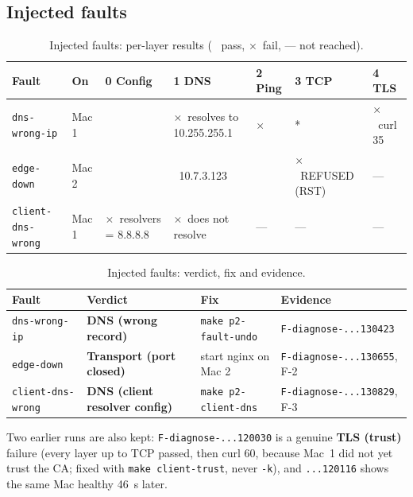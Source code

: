 \documentclass[11pt,a4paper]{article}
\newcommand{\ok}{\textcolor{lmGreen}{\checkmark}}
\newcommand{\bad}{\textcolor{lmRed}{$\times$}}
\begin{document}
\subsection{Injected faults}
\begin{table}[H]
\centering
\caption{Injected faults: per-layer results ( \ok\ pass, \bad\ fail, --- not reached).}
{\small
\begin{tabular}{@{}L{3.0cm}L{1.1cm}L{2.0cm}L{2.8cm}L{0.9cm}L{2.5cm}L{1.2cm}@{}}
\toprule
\textbf{Fault} & \textbf{On} & \textbf{0 Config} & \textbf{1 DNS} & \textbf{2 Ping} & \textbf{3 TCP} & \textbf{4 TLS} \\
\midrule
\texttt{dns-wrong-ip} & Mac 1 & \ok & \bad\ resolves to 10.255.255.1 & \bad & \ok* & \bad\ curl 35 \\
\texttt{edge-down} & Mac 2 & \ok & \ok\ 10.7.3.123 & \ok & \bad\ REFUSED (RST) & --- \\
\texttt{client-dns-wrong} & Mac 1 & \bad\ resolvers = 8.8.8.8 & \bad\ does not resolve & --- & --- & --- \\
\bottomrule
\end{tabular}}

\vspace{2pt}{\footnotesize * The campus gateway, not a real host (Incident 3).}
\end{table}

\begin{table}[H]
\centering
\caption{Injected faults: verdict, fix and evidence.}
{\small
\begin{tabular}{@{}L{3.0cm}L{3.8cm}L{3.5cm}L{3.9cm}@{}}
\toprule
\textbf{Fault} & \textbf{Verdict} & \textbf{Fix} & \textbf{Evidence} \\
\midrule
\texttt{dns-wrong-ip} & \textbf{DNS (wrong record)} & \texttt{make p2-fault-undo} & \texttt{F-diagnose-...130423} \\
\texttt{edge-down} & \textbf{Transport (port closed)} & start nginx on Mac 2 & \texttt{F-diagnose-...130655}, F-2 \\
\texttt{client-dns-wrong} & \textbf{DNS (client resolver config)} & \texttt{make p2-client-dns} & \texttt{F-diagnose-...130829}, F-3 \\
\bottomrule
\end{tabular}}
\end{table}

Two earlier runs are also kept: \texttt{F-diagnose-...120030} is a genuine \textbf{TLS (trust)}
failure (every layer up to TCP passed, then curl 60, because Mac~1 did not yet trust the CA; fixed
with \texttt{make client-trust}, never \texttt{-k}), and \texttt{...120116} shows the same Mac healthy
46~s later.
\end{document}
